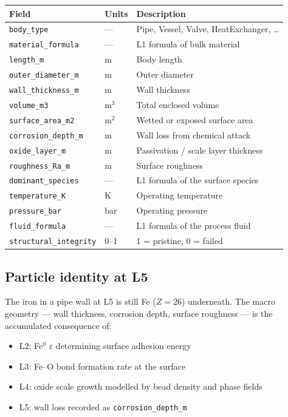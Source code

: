 \documentclass[11pt, a4paper, oneside]{article}
\theoremstyle{definition}
\begin{document}
\begin{center}
\begin{tabular}{lll}
\toprule
Field & Units & Description \\
\midrule
\texttt{body\_type} & — & Pipe, Vessel, Valve, HeatExchanger, \ldots \\
\texttt{material\_formula} & — & L1 formula of bulk material \\
\texttt{length\_m} & m & Body length \\
\texttt{outer\_diameter\_m} & m & Outer diameter \\
\texttt{wall\_thickness\_m} & m & Wall thickness \\
\texttt{volume\_m3} & m$^3$ & Total enclosed volume \\
\texttt{surface\_area\_m2} & m$^2$ & Wetted or exposed surface area \\
\midrule
\texttt{corrosion\_depth\_m} & m & Wall loss from chemical attack \\
\texttt{oxide\_layer\_m} & m & Passivation / scale layer thickness \\
\texttt{roughness\_Ra\_m} & m & Surface roughness \\
\texttt{dominant\_species} & — & L1 formula of the surface species \\
\midrule
\texttt{temperature\_K} & K & Operating temperature \\
\texttt{pressure\_bar} & bar & Operating pressure \\
\texttt{fluid\_formula} & — & L1 formula of the process fluid \\
\texttt{structural\_integrity} & 0--1 & 1 = pristine, 0 = failed \\
\bottomrule
\end{tabular}
\end{center}

\subsection{Particle identity at L5}

The iron in a pipe wall at L5 is still Fe ($Z = 26$) underneath.
The macro geometry — wall thickness, corrosion depth, surface roughness —
is the accumulated consequence of:
\begin{itemize}
  \item L2: Fe$^0$ $\varepsilon$ determining surface adhesion energy
  \item L3: Fe–O bond formation rate at the surface
  \item L4: oxide scale growth modelled by bead density and phase fields
  \item L5: wall loss recorded as \texttt{corrosion\_depth\_m}
\end{itemize}
\end{document}
